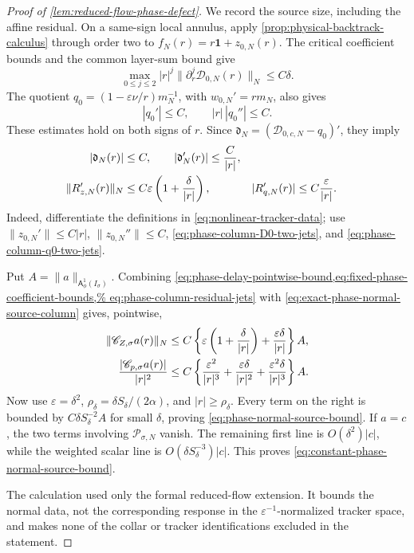 \begin{proof}[Proof of \cref{lem:reduced-flow-phase-defect}]
We record the source size, including the affine residual.  On a same-sign
local annulus, apply \cref{prop:physical-backtrack-calculus} through order
two to
\(f_N(r)=r\mathbf1+z_{0,N}(r)\).  The critical coefficient bounds and the
common layer-sum bound give
\begin{equation}
 \max_{0\le j\le2}|r|^j
       \|\partial_r^j\mathcal D_{0,N}(r)\|_N
 \le C\delta.                                      \label{eq:phase-column-D0-two-jets}
\end{equation}
The quotient
\(
 q_0=(1-\varepsilon\nu/r)m_N^{-1}
\), with \(w_{0,N}'=rm_N\), also gives
\begin{equation}
 |q_0'|\le C,\qquad |r|\,|q_0''|\le C.             \label{eq:phase-column-q0-two-jets}
\end{equation}
These estimates hold on both signs of \(r\).  Since
\(\mathfrak d_N=(\mathcal D_{0,c,N}-q_0)'\), they imply
\begin{align}
 |\mathfrak d_N(r)|&\le C,\qquad
 |\mathfrak d_N'(r)|\le\frac C{|r|},\notag\\
 \|R_{z,N}'(r)\|_N
 &\le C\varepsilon\left(1+\frac{\delta}{|r|}\right),
 &|R_{q,N}'(r)|
 &\le C\frac{\varepsilon}{|r|}.                   \label{eq:phase-column-residual-jets}
\end{align}
Indeed, differentiate the definitions in
\cref{eq:nonlinear-tracker-data}; use
\(\|z_{0,N}'\|\le C|r|\), \(\|z_{0,N}''\|\le C\),
\cref{eq:phase-column-D0-two-jets}, and
\cref{eq:phase-column-q0-two-jets}.

Put \(A=\|a\|_{\mathsf A_\phi^1(I_\sigma)}\).  Combining
\cref{eq:phase-delay-pointwise-bound,eq:fixed-phase-coefficient-bounds,%
eq:phase-column-residual-jets} with
\cref{eq:exact-phase-normal-source-column} gives, pointwise,
\begin{align}
 \|\mathscr C_{Z,\sigma}a(r)\|_N
 &\le C\left\{\varepsilon\left(1+\frac{\delta}{|r|}\right)
          +\frac{\varepsilon\delta}{|r|}\right\}A,\notag\\
 \frac{|\mathscr C_{p,\sigma}a(r)|}{|r|^2}
 &\le C\left\{\frac{\varepsilon^2}{|r|^3}
        +\frac{\varepsilon\delta}{|r|^2}
        +\frac{\varepsilon^2\delta}{|r|^3}\right\}A.
                                                        \label{eq:phase-column-source-components}
\end{align}
Now use
\(\varepsilon=\delta^2\),
\(\rho_\delta=\delta S_\delta/(2\alpha)\), and
\(|r|\ge\rho_\delta\).  Every term on the right is bounded by
\(C\delta S_\delta^{-2}A\) for small \(\delta\), proving
\cref{eq:phase-normal-source-bound}.  If \(a=c\), the two terms involving
\(\mathscr P_{\sigma,N}\) vanish.  The remaining first line is
\(O(\delta^2)|c|\), while the weighted scalar line is
\(O(\delta S_\delta^{-3})|c|\).  This proves
\cref{eq:constant-phase-normal-source-bound}.

The calculation used only the formal reduced-flow extension.  It bounds
the normal data, not the corresponding response in the
\(\varepsilon^{-1}\)-normalized tracker space, and makes none of the collar
or tracker identifications excluded in the statement.
\end{proof}

